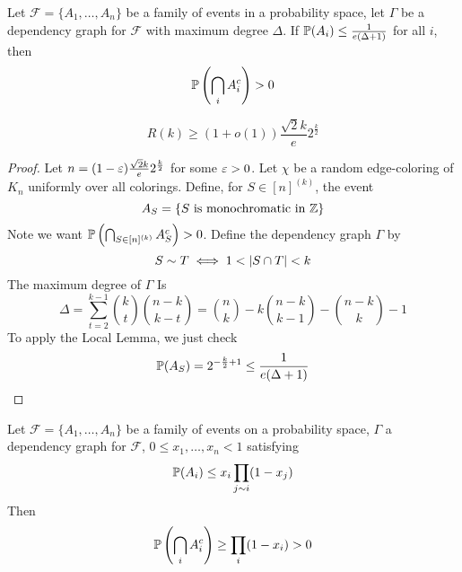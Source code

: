 \documentclass{article}
\begin{document}
\begin{thm}
  Let $\mathcal F = \{A_1, \dots, A_n\}$ be a family of events in a probability space, let $\Gamma$ be a dependency graph for $\mathcal F$ with maximum degree $\Delta$. If $\P(A_i) \le \frac 1{e(\Delta + 1)}$ for all $i$, then
  $$\P\left(\Inter_i A_i^c\right) > 0$$
\end{thm}

\begin{thm}[Spencer]
  $$R(k) \ge (1 + o(1)) \frac{\sqrt 2k}e 2^{\frac k2}$$
\end{thm}
\begin{proof}
  Let $n = (1 - \eps)\frac{\sqrt 2k}e2^{\frac k2}$ for some $\eps > 0$. Let $\chi$ be a random edge-coloring of $K_n$ uniformly over all colorings. Define, for $S \in [n]^{(k)}$, the event
  $$A_S = \{S \text{ is monochromatic in } \Z\}$$
  Note we want $\P\left(\Inter_{S \in [n]^{(k)}} A_S^c\right) > 0$. Define the dependency graph $\Gamma$ by
  $$S \sim T \iff 1 < \abs{S \inter T} < k$$
  The maximum degree of $\Gamma$ Is
  $$\Delta = \sum_{t = 2}^{k - 1}\binom kt\binom{n - k}{k - t} = \binom nk - k\binom{n - k}{k - 1} - \binom{n - k}k - 1$$
  To apply the Local Lemma, we just check
  $$\P(A_S) = 2^{-\frac k2 + 1} \le \frac 1{e(\Delta + 1)}$$
\end{proof}

\begin{thm}
  Let $\mathcal F = \{A_1, \dots, A_n\}$ be a family of events on a probability space, $\Gamma$ a dependency graph for $\mathcal F$, $0 \le x_1, \dots, x_n < 1$ satisfying
  $$\P(A_i) \le x_i \prod_{j \sim i}(1 - x_j)$$
  Then
  $$\P\left(\Inter_i A_i^c\right) \ge \prod_i (1 - x_i) > 0$$
\end{thm}
\end{document}
